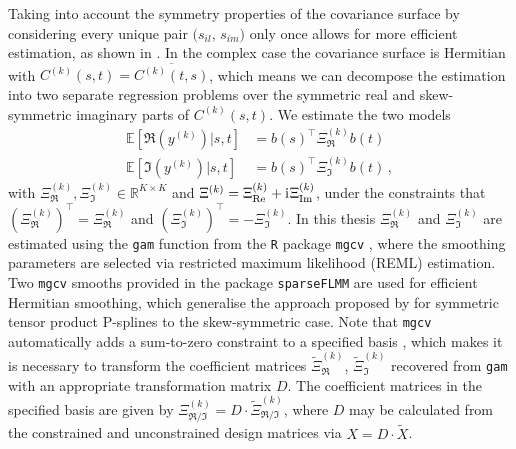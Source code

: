 Taking into account the symmetry properties of the covariance surface by considering every unique pair $(s_{il}$, $s_{im})$ only once allows for more efficient estimation, as shown in \cite{CederbaumScheiplGreven2018}. 
In the complex case the covariance surface is Hermitian with $C^{(k)}(s,t) = \overline{C^{(k)}(t,s)}$, which means we can decompose the estimation into two separate regression problems over the symmetric real and skew-symmetric imaginary parts of $C^{(k)}(s,t)$.
We estimate the two models
\begin{align}
  \mathbb{E}[\Re(y^{(k)})|s,t] &= b(s)^\top \Xi^{(k)}_{\Re} b(t) \\
  \mathbb{E}[\Im(y^{(k)})|s,t] &= b(s)^\top \Xi^{(k)}_{\Im} b(t)\,,
\end{align}
with $\Xi^{(k)}_\Re, \Xi^{(k)}_\Im \in \mathbb{R}^{K\times K}$ and $\Xi^{(k)} = \Xi^{(k)}_{\mathrm{Re}} + \mathrm{i}\mkern1mu \Xi^{(k)}_{\mathrm{Im}}$, under the constraints that $(\Xi^{(k)}_\Re)^\top = \Xi^{(k)}_\Re$ and $(\Xi^{(k)}_\Im)^\top = - \Xi^{(k)}_\Im$.
In this thesis  $\Xi^{(k)}_\Re$ and $\Xi^{(k)}_\Im$ are estimated using the \texttt{gam} function from the \texttt{R} package \texttt{mgcv} \parencite{Wood2017}, where the smoothing parameters are selected via restricted maximum likelihood (REML) estimation.
Two \texttt{mgcv} smooths provided in the package \texttt{sparseFLMM} \parencite{sparseFLMM} are used for efficient Hermitian smoothing, which generalise the approach proposed by \cite{CederbaumScheiplGreven2018} for symmetric tensor product P-splines to the skew-symmetric case.
Note that \texttt{mgcv} automatically adds a sum-to-zero constraint to a specified basis \parencite[see][175]{Wood2017}, which makes it is necessary to transform the coefficient matrices $\widetilde \Xi_\Re^{(k)}$, $\widetilde \Xi_\Im^{(k)}$ recovered from \texttt{gam} with an appropriate transformation matrix $D$.
The coefficient matrices in the specified basis are given by $\Xi_{\Re/\Im}^{(k)} = D \cdot \widetilde \Xi_ {\Re/\Im}^{(k)}$, where $D$ may be calculated from the constrained and unconstrained design matrices via $X = D \cdot \widetilde X$.

